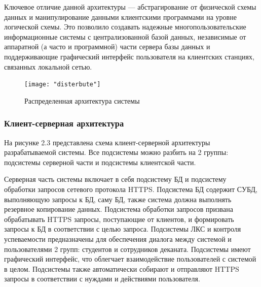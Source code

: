 \documentclass[a4paper,14pt]{extarticle}
\begin{document}
Ключевое отличие данной архитектуры --- абстрагирование от физической схемы данных и манипулирование
данными клиентскими программами на уровне логической схемы. Это позволило создавать надежные многопользовательские информационные системы с
централизованной базой данных, независимые от аппаратной (а
часто и программной) части сервера базы данных и поддерживающие
графический интерфейс пользователя на клиентских станциях,
связанных локальной сетью. 

\begin{figure}[h!]
	\centering
	\texttt{[image: "disterbute"]}
	\caption{Распределенная архитектура системы}
	\label{fig:disterbute}
\end{figure}


\subsubsection{Клиент-серверная архитектура}
На рисунке 2.3 представлена схема клиент-серверной архитектуры разрабатываемой  системы.
Все подсистемы можно разбить на 2 группы: подсистемы серверной части и подсистемы клиентской части. 

Серверная часть системы включает в себя подсистему БД и подсистему обработки запросов сетевого протокола HTTPS. Подсистема БД содержит СУБД, выполняющую запросы к БД, саму БД, также система должна выполнять резервное копирование данных. Подсистема обработки запросов призвана обрабатывать HTTPS запросы, поступающие от клиентов, и формировать запросы к БД в соответствии с целью запроса.
Подсистемы ЛКС и контроля успеваемости предназначены для обеспечения диалога между системой и пользователями 2 групп: студентов и сотрудников деканата. Подсистемы имеют графический интерфейс, что облегчает взаимодействие пользователей с системой в целом. Подсистемы также автоматически собирают и отправляют HTTPS запросы в соответствии с нуждами и действиями пользователя.
\end{document}
